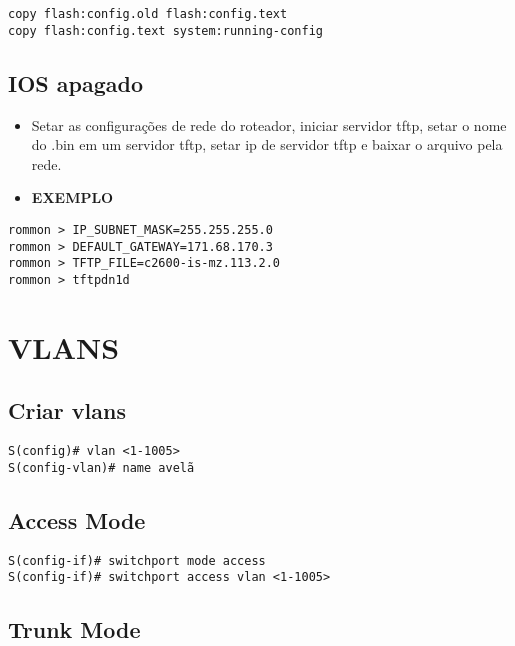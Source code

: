 \documentclass[]{article}
\begin{document}
\begin{verbatim}
copy flash:config.old flash:config.text
copy flash:config.text system:running-config
\end{verbatim}

\subsection{IOS apagado}\label{ios-apagado}

\begin{itemize}
\item
  Setar as configurações de rede do roteador, iniciar servidor tftp,
  setar o nome do .bin em um servidor tftp, setar ip de servidor tftp e
  baixar o arquivo pela rede.
\item
  \textbf{EXEMPLO}
\end{itemize}

\begin{verbatim}
rommon > IP_SUBNET_MASK=255.255.255.0
rommon > DEFAULT_GATEWAY=171.68.170.3
rommon > TFTP_FILE=c2600-is-mz.113.2.0
rommon > tftpdn1d
\end{verbatim}

\section{VLANS}\label{vlans}

\subsection{Criar vlans}\label{criar-vlans}

\begin{verbatim}
S(config)# vlan <1-1005>
S(config-vlan)# name avelã
\end{verbatim}

\subsection{Access Mode}\label{access-mode}

\begin{verbatim}
S(config-if)# switchport mode access
S(config-if)# switchport access vlan <1-1005>
\end{verbatim}

\subsection{Trunk Mode}\label{trunk-mode}
\end{document}
